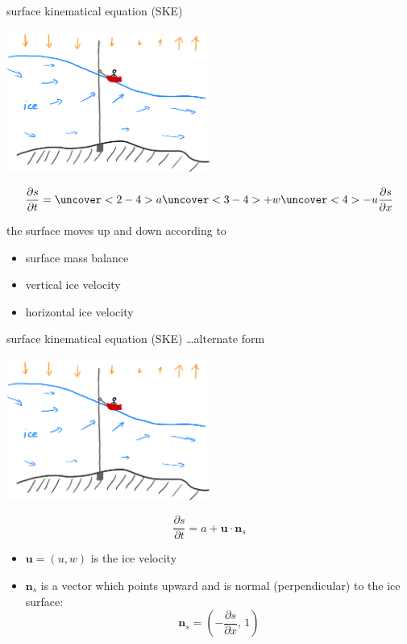 \documentclass[10pt,dvipsnames]{beamer}
\newcommand{\bn}{\mathbf{n}}
\newcommand{\bu}{\mathbf{u}}
\begin{document}
\begin{frame}{surface kinematical equation (SKE)}
\begin{center}
\includegraphics[width=0.5\textwidth]{boatplus}
\end{center}

\vspace{-5mm}
\begin{equation*}
\frac{\partial s}{\partial t} = \uncover<2-4>{a} \uncover<3-4>{+w} \uncover<4>{-u \frac{\partial s}{\partial x}}
\end{equation*}

the surface moves up and down according to
\begin{itemize}
\item<2-4> surface mass balance
\item<3-4> vertical ice velocity
\item<4> horizontal ice velocity
\end{itemize}
\end{frame}

\begin{frame}{surface kinematical equation (SKE) \dots alternate form}
\begin{center}
\includegraphics[width=0.5\textwidth]{boatplus}
\end{center}

\vspace{-5mm}
\begin{equation*}
\frac{\partial s}{\partial t} = a + \bu \cdot \bn_s
\end{equation*}

\begin{itemize}
\item $\bu=(u,w)$ is the ice velocity
\item $\bn_s$ is a vector which points upward and is normal (perpendicular) to the ice surface:
	$$\bn_s = \left(-\frac{\partial s}{\partial x}, \,1\right)$$
\end{itemize}
\end{frame}
\end{document}
